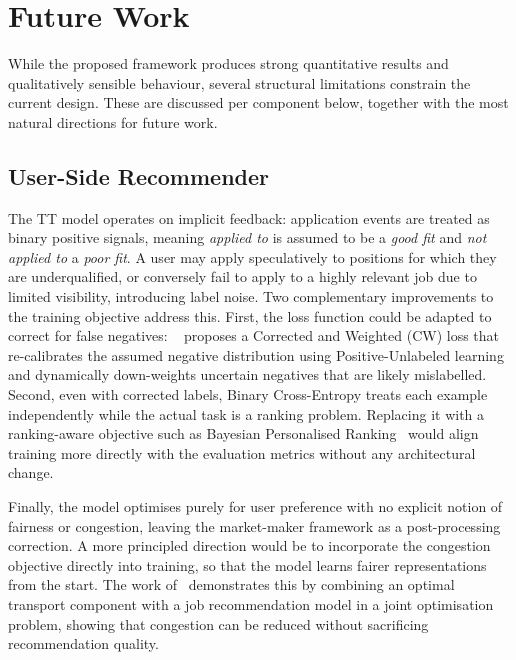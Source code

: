 \chapter*{Future Work}
\label{ch:future-work}

While the proposed framework produces strong quantitative results and qualitatively 
sensible behaviour, several structural limitations constrain the current design. These 
are discussed per component below, together with the most natural directions for 
future work.

\section{User-Side Recommender}

The \gls{TT} model operates on implicit feedback: application events are treated as 
binary positive signals, meaning \emph{applied to} is assumed to be a \emph{good fit} 
and \emph{not applied to} a \emph{poor fit}. A user may apply speculatively to 
positions for which they are underqualified, or conversely fail to apply to a highly 
relevant job due to limited visibility, introducing label noise. Two complementary 
improvements to the training objective address this. First, the loss function could be 
adapted to correct for false negatives: ~\cite{yin2026correctweightsimpleeffective} 
proposes a Corrected and Weighted (CW) loss that re-calibrates the assumed negative 
distribution using Positive-Unlabeled learning and dynamically down-weights uncertain 
negatives that are likely mislabelled. Second, even with corrected labels, Binary 
Cross-Entropy treats each example independently while the actual task is a ranking 
problem. Replacing it with a ranking-aware objective such as Bayesian Personalised 
Ranking~\cite{rendle2012bprbayesianpersonalizedranking} would align training more 
directly with the evaluation metrics without any architectural change.

Finally, the model optimises purely for user preference with no explicit notion of 
fairness or congestion, leaving the market-maker framework as a post-processing 
correction. A more principled direction would be to incorporate the congestion 
objective directly into training, so that the model learns fairer representations from 
the start. The work of~\cite{mashayekhi2023reconreducingcongestionjob} demonstrates 
this by combining an optimal transport component with a job recommendation model in a 
joint optimisation problem, showing that congestion can be reduced without sacrificing 
recommendation quality.

